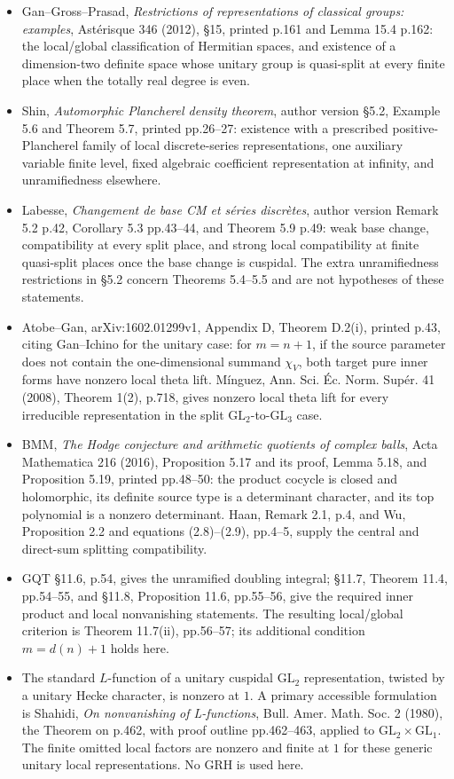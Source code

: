 \documentclass[11pt,a4paper]{article}
\providecommand{\tightlist}{\setlength{\itemsep}{0pt}\setlength{\parskip}{0pt}}
\theoremstyle{definition}
\begin{document}
\begin{itemize}
\tightlist
\item
  Gan--Gross--Prasad, \emph{Restrictions of representations of classical groups: examples}, Astérisque 346 (2012), §15, printed p.161 and Lemma 15.4 p.162: the local/global classification of Hermitian spaces, and existence of a dimension-two definite space whose unitary group is quasi-split at every finite place when the totally real degree is even.
\item
  Shin, \emph{Automorphic Plancherel density theorem}, author version §5.2, Example 5.6 and Theorem 5.7, printed pp.26--27: existence with a prescribed positive-Plancherel family of local discrete-series representations, one auxiliary variable finite level, fixed algebraic coefficient representation at infinity, and unramifiedness elsewhere.
\item
  Labesse, \emph{Changement de base CM et séries discrètes}, author version Remark 5.2 p.42, Corollary 5.3 pp.43--44, and Theorem 5.9 p.49: weak base change, compatibility at every split place, and strong local compatibility at finite quasi-split places once the base change is cuspidal. The extra unramifiedness restrictions in §5.2 concern Theorems 5.4--5.5 and are not hypotheses of these statements.
\item
  Atobe--Gan, arXiv:1602.01299v1, Appendix D, Theorem D.2(i), printed p.43, citing Gan--Ichino for the unitary case: for \(m=n+1\), if the source parameter does not contain the one-dimensional summand \(\chi_V\), both target pure inner forms have nonzero local theta lift. Mínguez, Ann. Sci. Éc. Norm. Supér. 41 (2008), Theorem 1(2), p.718, gives nonzero local theta lift for every irreducible representation in the split \(\mathrm{GL}_2\)-to-\(\mathrm{GL}_3\) case.
\item
  BMM, \emph{The Hodge conjecture and arithmetic quotients of complex balls}, Acta Mathematica 216 (2016), Proposition 5.17 and its proof, Lemma 5.18, and Proposition 5.19, printed pp.48--50: the product cocycle is closed and holomorphic, its definite source type is a determinant character, and its top polynomial is a nonzero determinant. Haan, Remark 2.1, p.4, and Wu, Proposition 2.2 and equations (2.8)--(2.9), pp.4--5, supply the central and direct-sum splitting compatibility.
\item
  GQT §11.6, p.54, gives the unramified doubling integral; §11.7, Theorem 11.4, pp.54--55, and §11.8, Proposition 11.6, pp.55--56, give the required inner product and local nonvanishing statements. The resulting local/global criterion is Theorem 11.7(ii), pp.56--57; its additional condition \(m=d(n)+1\) holds here.
\item
  The standard \(L\)-function of a unitary cuspidal \(\mathrm{GL}_2\) representation, twisted by a unitary Hecke character, is nonzero at \(1\). A primary accessible formulation is Shahidi, \emph{On nonvanishing of L-functions}, Bull. Amer. Math. Soc. 2 (1980), the Theorem on p.462, with proof outline pp.462--463, applied to \(\mathrm{GL}_2\times\mathrm{GL}_1\). The finite omitted local factors are nonzero and finite at \(1\) for these generic unitary local representations. No GRH is used here.
\end{itemize}
\end{document}
